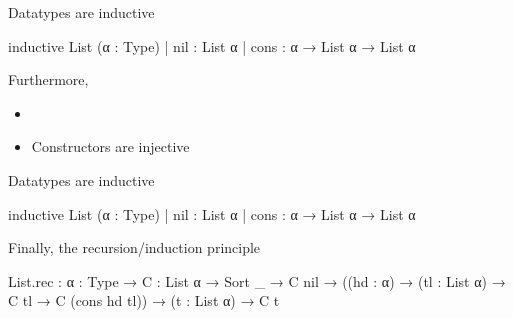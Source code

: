 \documentclass[t,12pt]{beamer}
\begin{document}

 



\begin{frame}[fragile]{Datatypes are inductive}
    \bigskip
\begin{leancode}
inductive List (α : Type)
  | nil  : List α
  | cons : α → List α → List α
\end{leancode}

\bigskip


 {
Furthermore,
\begin{itemize}
    \item {}
    \item Constructors are injective
\end{itemize}
}
\end{frame}





\begin{frame}[fragile]{Datatypes are inductive}
    \bigskip
\begin{leancode}
inductive List (α : Type)
  | nil  : List α
  | cons : α → List α → List α
\end{leancode}

\bigskip
Finally, the recursion/induction principle
\medskip

\begin{leancode}
List.rec : {α : Type} →
    {C : List α → Sort _} →
    C nil → 
    ((hd : α) → (tl : List α) 
        → C tl → C (cons hd tl)) → 
    (t : List α) →
    C t
\end{leancode}

\end{frame}
    
\end{document}
